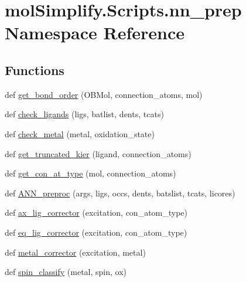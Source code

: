 \hypertarget{namespacemolSimplify_1_1Scripts_1_1nn__prep}{}\section{mol\+Simplify.\+Scripts.\+nn\+\_\+prep Namespace Reference}
\label{namespacemolSimplify_1_1Scripts_1_1nn__prep}
\subsection*{Functions}
\begin{DoxyCompactItemize}
\item 
def \hyperlink{namespacemolSimplify_1_1Scripts_1_1nn__prep_a05159d47e72ce1a13d9d13f917160b2c}{get\+\_\+bond\+\_\+order} (O\+B\+Mol, connection\+\_\+atoms, mol)
\item 
def \hyperlink{namespacemolSimplify_1_1Scripts_1_1nn__prep_a886cbe5fdacd2ab2b935e4de4be00185}{check\+\_\+ligands} (ligs, batlist, dents, tcats)
\item 
def \hyperlink{namespacemolSimplify_1_1Scripts_1_1nn__prep_aeadb6e00c7c17b6433340c848de5cb22}{check\+\_\+metal} (metal, oxidation\+\_\+state)
\item 
def \hyperlink{namespacemolSimplify_1_1Scripts_1_1nn__prep_a6e362641f9e9d278d4c02be4378ae79b}{get\+\_\+truncated\+\_\+kier} (ligand, connection\+\_\+atoms)
\item 
def \hyperlink{namespacemolSimplify_1_1Scripts_1_1nn__prep_a9c124e2a3697720abcec05fc4faf59c8}{get\+\_\+con\+\_\+at\+\_\+type} (mol, connection\+\_\+atoms)
\item 
def \hyperlink{namespacemolSimplify_1_1Scripts_1_1nn__prep_a1dc3c3db41886be863ad7596a4894653}{A\+N\+N\+\_\+preproc} (args, ligs, occs, dents, batslist, tcats, licores)
\item 
def \hyperlink{namespacemolSimplify_1_1Scripts_1_1nn__prep_ae8c4328eb9dd534e5c4375e3c53df085}{ax\+\_\+lig\+\_\+corrector} (excitation, con\+\_\+atom\+\_\+type)
\item 
def \hyperlink{namespacemolSimplify_1_1Scripts_1_1nn__prep_a7c2cd82af946aee3bed727a31405eca8}{eq\+\_\+lig\+\_\+corrector} (excitation, con\+\_\+atom\+\_\+type)
\item 
def \hyperlink{namespacemolSimplify_1_1Scripts_1_1nn__prep_a0c4e7efeeae61991d7e3293b9e25d5d4}{metal\+\_\+corrector} (excitation, metal)
\item 
def \hyperlink{namespacemolSimplify_1_1Scripts_1_1nn__prep_a8e2c0d673aed80ee80d5599c809bc8d6}{spin\+\_\+classify} (metal, spin, ox)

\end{DoxyCompactItemize}
